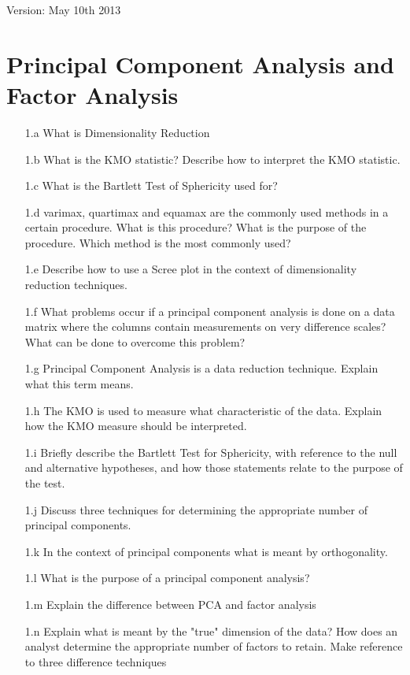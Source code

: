 \documentclass[a4paper,12pt]{article}
\begin{document}
Version: May 10th 2013
\section*{Principal Component Analysis and Factor Analysis}
\begin{itemize}
\item[1.a] What is Dimensionality Reduction
\item[1.b] What is the KMO statistic? Describe how to interpret the KMO statistic.
\item[1.c] What is the Bartlett Test of Sphericity used for?
\item[1.d] varimax, quartimax and equamax are the commonly used methods in a certain procedure. What is this procedure? What is the purpose of the procedure.
Which method is the most commonly used?
\item[1.e] Describe how to use a Scree plot in the context of dimensionality reduction techniques.
\item[1.f] What problems occur if a principal component analysis is done on a data matrix where the columns contain measurements on very difference scales?  What can be done to overcome this problem?
\item[1.g] Principal Component Analysis is a data reduction technique. Explain what this term
means.
\item[1.h] The KMO is used to measure what characteristic of the data. Explain how the KMO
measure should be interpreted.
\item[1.i] Briefly describe the Bartlett Test for Sphericity, with reference to the null and alternative
hypotheses, and how those statements relate to the purpose of the test.
\item[1.j] Discuss three techniques for determining the appropriate number of principal components.
\item[1.k] In the context of principal components what is meant by orthogonality.

\item[1.l] What is the purpose of a principal component analysis?
\item[1.m] Explain the difference between PCA and factor analysis
\item[1.n] Explain what is meant by the "true" dimension of the data? How does an analyst determine the appropriate number of factors to retain. Make reference to three difference techniques
\end{itemize}
\end{document}
